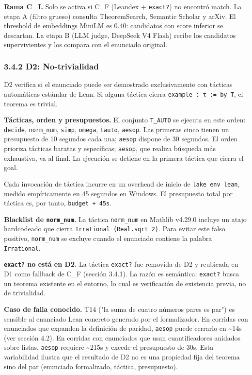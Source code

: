 \documentclass[12pt,a4paper]{article}
\theoremstyle{remark}
\begin{document}
\textbf{Rama C\_I.} Solo se activa si C\_F (Leandex + \texttt{exact?}) no encontró match. La etapa A (filtro grueso) consulta TheoremSearch, Semantic Scholar y arXiv. El threshold de embeddings MiniLM es 0.40: candidatos con score inferior se descartan. La etapa B (LLM judge, DeepSeek V4 Flash) recibe los candidatos supervivientes y los compara con el enunciado original.


\subsubsection{3.4.2 D2: No-trivialidad}

D2 verifica si el enunciado puede ser demostrado exclusivamente con tácticas automáticas estándar de Lean. Si alguna táctica cierra \texttt{example : τ := by T}, el teorema es trivial.

\textbf{Tácticas, orden y presupuestos.} El conjunto \texttt{T\_AUTO} se ejecuta en este orden: \texttt{decide}, \texttt{norm\_num}, \texttt{simp}, \texttt{omega}, \texttt{tauto}, \texttt{aesop}. Las primeras cinco tienen un presupuesto de 10 segundos cada una; \texttt{aesop} dispone de 30 segundos. El orden prioriza tácticas baratas y específicas; \texttt{aesop}, que realiza búsqueda más exhaustiva, va al final. La ejecución se detiene en la primera táctica que cierra el goal.


Cada invocación de táctica incurre en un overhead de inicio de \texttt{lake env lean}, medido empíricamente en 45 segundos en Windows. El presupuesto total por táctica es, por tanto, \texttt{budget + 45s}.


\textbf{Blacklist de \texttt{norm\_num}.} La táctica \texttt{norm\_num} en Mathlib v4.29.0 incluye un atajo hardcodeado que cierra \texttt{Irrational (Real.sqrt 2)}. Para evitar este falso positivo, \texttt{norm\_num} se excluye cuando el enunciado contiene la palabra \texttt{Irrational}.


\textbf{\texttt{exact?} no está en D2.} La táctica \texttt{exact?} fue removida de D2 y reubicada en D1 como fallback de C\_F (sección 3.4.1). La razón es semántica: \texttt{exact?} busca un teorema existente en el entorno, lo cual es verificación de existencia previa, no de trivialidad.


\textbf{Caso de falla conocido.} T14 ("la suma de cuatro números pares es par") es sensible al enunciado Lean concreto generado por el formalizador. En corridas con enunciados que expanden la definición de paridad, \texttt{aesop} puede cerrarlo en \textasciitilde{}14s (ver sección 4.2). En corridas con enunciados que usan cuantificadores anidados sobre listas, \texttt{aesop} requiere \textasciitilde{}215s y excede el presupuesto de 30s. Esta variabilidad ilustra que el resultado de D2 no es una propiedad fija del teorema sino del par (enunciado formalizado, táctica, presupuesto).
\end{document}

